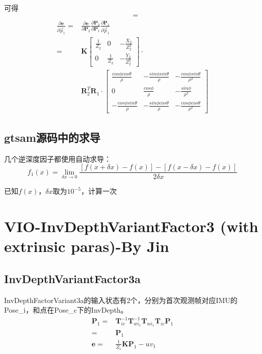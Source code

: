 \documentclass{article}
\begin{document}
可得
\begin{equation}
	\begin{aligned}
		&= 
	\end{aligned}
\end{equation} 
\begin{equation}
	\begin{aligned}
		\frac{\partial{\boldsymbol{e}}}{\partial{\vec{p}_1}} =&\frac {\partial{\boldsymbol{e}}}{\partial{\boldsymbol{P}_2}}\frac{\partial{\boldsymbol{P}} _2}{\partial{\boldsymbol{P}_1}} \frac{\partial{\boldsymbol{P}_1}} {\partial{\vec{p}_1}} \\
		=& \boldsymbol{K}
		\left[
		\begin{matrix}
		\frac{1}{Z_2} & 0             & -\frac{X_2}{Z_2^2} \\
		0             & \frac{1}{Z_2} & -\frac{Y_2}{Z_2^2} 
		\end{matrix}
		\right]\cdot\\&
		\boldsymbol{R}_2^{T}\boldsymbol{R}_1\cdot 
		\left[
		\begin{matrix}
		\frac{cos\phi cos\theta}{\rho}  & -\frac{sin\phi sin\theta}{\rho} & -\frac{cos\phi sin\theta}{\rho^2} \\
		0                               & \frac{cos\phi}{\rho}            & -\frac{sin\phi}{\rho^2}           \\
		-\frac{cos\phi sin\theta}{\rho} & -\frac{sin\phi cos\theta}{\rho} & -\frac{cos\phi cos\theta}{\rho^2} 
		\end{matrix}
		\right]
	\end{aligned}
\end{equation}
			
\subsection{gtsam源码中的求导}
几个逆深度因子都使用自动求导：
$$
f_1(x)=\lim_ {\delta{x} \rightarrow0}\frac{[f(x+\delta{x} )-f(x)]-[f(x-\delta{x} )-f(x)]}{2\delta{x}}
$$

已知$f(x)$，$\delta{x} $取为$10^{-5}$，计算一次
			
\section{VIO-InvDepthVariantFactor3 (with extrinsic paras)-By Jin}

\subsection{InvDepthVariantFactor3a}
InvDepthFactorVariant3a的输入状态有2个，分别为首次观测帧对应IMU的Pose\_i，和点在Pose\_c下的InvDepth。
$$
\begin{aligned}
	\boldsymbol{P}_1  =& \boldsymbol{T}_{ic}^{-1}\boldsymbol{T}_{wi_1}^{-1}\boldsymbol{T}_{wi_1}\boldsymbol{T}_{ic}\boldsymbol{P}_1 \\=&
	\boldsymbol{P}_1 \\
	\boldsymbol{e}    =& \frac{1}{Z_1}\boldsymbol{K} \boldsymbol{P}_1-uv_1     
\end{aligned}
$$
\end{document}
